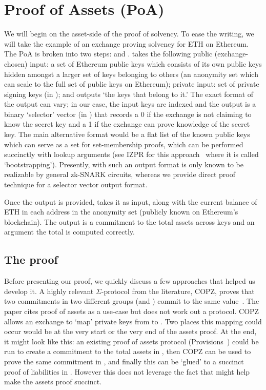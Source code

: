 
\section{Proof of Assets (PoA)}

We will begin on the asset-side of the proof of solvency. To ease the writing, we will take the example of an exchange proving solvency for ETH on Ethereum. The PoA is broken into two steps: \bootstrap and \poa. \bootstrap takes the following public (exchange-chosen) input: a set of Ethereum public keys which consists of its own public keys hidden amongst a larger set of keys belonging to others (\ie an anonymity set which can scale to the full set of public keys on Ethereum); private input: set of private signing keys (in \secp); and outputs `the keys that belong to it.' The exact format of the output can vary; in our case, the input keys are indexed and the output is a binary `selector' vector (in \bls) that records a 0 if the exchange is not claiming to know the secret key and a 1 if the exchange can prove knowledge of the secret key. The main alternative format would be a flat list of the known public keys which can serve as a set for set-membership proofs, which can be performed succinctly with lookup arguments (see IZPR for this approach~\cite{izpr} where it is called `bootstrapping'). Presently, \bootstrap with such an output format is only known to be realizable by general zk-SNARK circuits, whereas we provide direct proof technique for a selector vector output format.

Once the \bootstrap output is provided, \poa takes it as input, along with the current balance of ETH in each address in the anonymity set (publicly known on Ethereum's blockchain). The output is a commitment to the total assets across keys and an argument the total is computed correctly. 


\subsection{The \bootstrap proof}


Before presenting our \bootstrap proof, we quickly discuss a few approaches that helped us develop it. A highly relevant $\Sigma$-protocol from the literature, COPZ, proves that two commitments in two different groups (\eg \secp and \bls) commit to the same value~\cite{chase22}. The paper cites proof of assets as a use-case but does not work out a protocol. COPZ allows an exchange to `map' private keys from \secp to \bls. Two places this mapping could occur would be at the very start or the very end of the assets proof. At the end, it might look like this: an existing proof of assets protocol (\eg Provisions~\cite{provisions}) could be run to create a commitment to the total assets in \secp, then COPZ can be used to prove the same commitment in \bls, and finally this can be `glued' to a succinct proof of liabilities in \bls. However this does not leverage the fact that \bls might help make the assets proof succinct.

